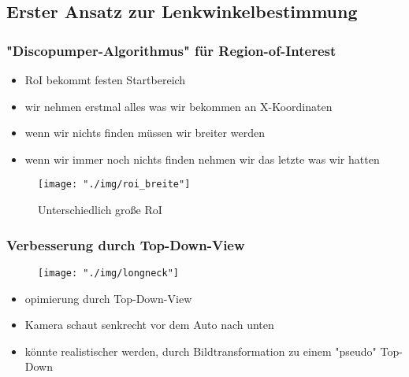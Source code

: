 \documentclass{beamer}
\begin{document}
	\subsection{Erster Ansatz zur Lenkwinkelbestimmung}
	
	\begin{frame}
		\frametitle{"Discopumper-Algorithmus" für Region-of-Interest}
		\begin{itemize}
			\item RoI bekommt festen Startbereich
			\item wir nehmen erstmal alles was wir bekommen an X-Koordinaten
			\item wenn wir nichts finden müssen wir breiter werden
			\item wenn wir immer noch nichts finden nehmen wir das letzte was wir hatten
		\end{itemize}

		\begin{center}
			\begin{figure}[h]
				\texttt{[image: "./img/roi\_breite"]}
				\label{fig:roi}
				\caption{Unterschiedlich große RoI}
			\end{figure}
		\end{center}
 	\end{frame}

	\begin{frame}
		\frametitle{Verbesserung durch Top-Down-View}
		\begin{center}
			\begin{figure}[h]
				\texttt{[image: "./img/longneck"]}
				\label{fig:longneck}
			\end{figure}
		\end{center}

	\begin{itemize}
		\item opimierung durch Top-Down-View
		\item Kamera schaut senkrecht vor dem Auto nach unten
		\item könnte realistischer werden, durch Bildtransformation zu einem "pseudo" Top-Down 
	\end{itemize}
	\end{frame}
\end{document}
